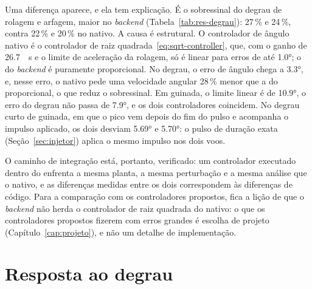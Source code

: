 Uma diferença aparece, e ela tem explicação. É o sobressinal do degrau de
rolagem e arfagem, maior no \textit{backend}
(Tabela~\ref{tab:res-degrau}): 27\,\% e 24\,\%, contra 22\,\% e 20\,\% no
nativo. A causa é estrutural. O controlador de ângulo nativo é o controlador
de raiz quadrada~\eqref{eq:sqrt-controller}, que, com o ganho de
\SI{26.7}{\per\second} e o limite de aceleração da rolagem, só é linear para
erros de até \ang{1.0}; o do \textit{backend} é puramente proporcional. No
degrau, o erro de ângulo chega a \ang{3.3}, e, nesse erro, o nativo pede uma
velocidade angular 28\,\% menor que a do proporcional, o que reduz o
sobressinal. Em guinada, o limite linear é de \ang{10.9}, o erro do degrau
não passa de \ang{7.9}, e os dois controladores coincidem. No degrau curto
de guinada, em que o pico vem depois do fim do pulso e acompanha o impulso
aplicado, os dois desviam \ang{5.69} e \ang{5.70}: o pulso de duração exata
(Seção~\ref{sec:injetor}) aplica o mesmo impulso nos dois voos.

O caminho de integração está, portanto, verificado: um controlador executado
dentro do  enfrenta a mesma planta, a mesma
perturbação e a mesma análise que o nativo, e as diferenças medidas entre os
dois correspondem às diferenças de código. Para a comparação com os
controladores propostos, fica a lição de que o \textit{backend} não herda o
controlador de raiz quadrada do nativo: o que os controladores propostos
fizerem com erros grandes é escolha de projeto
(Capítulo~\ref{cap:projeto}), e não um detalhe de implementação.

\section{Resposta ao degrau}
\label{sec:res-degrau}

\begin{table}[htbp]
\centering
\caption{Resposta ao degrau de atitude: \ang{10} em rolagem e arfagem e
\ang{30} em guinada.}
\label{tab:res-degrau}
\small
\resizebox{\textwidth}{!}{}

\nota{\raggedright }
\end{table}

